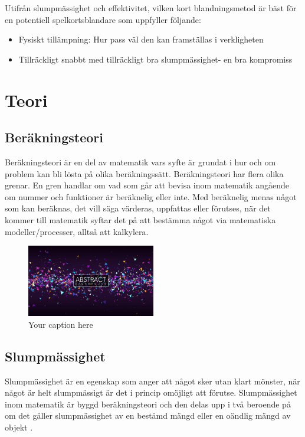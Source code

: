 \documentclass[swedish,a4paper]{article}
\begin{document}
Utifrån slumpmässighet och effektivitet, vilken kort blandningsmetod är bäst för
en potentiell spelkortsblandare som uppfyller följande:
\begin{itemize}
	\item Fysiskt tillämpning: Hur pass väl den kan framställas i verkligheten 
	\item Tillräckligt snabbt med tillräckligt bra slumpmässighet- en bra
		kompromiss
\end{itemize}
\section{Teori}
\subsection{Beräkningsteori}

Beräkningsteori är en del av matematik vars syfte är grundat i hur och om
problem kan bli lösta på olika beräkningssätt. Beräkningsteori har flera olika
grenar. En gren handlar om vad som går att bevisa inom matematik angående om
nummer och funktioner är beräknelig eller inte. Med beräknelig menas något som
kan beräknas, det vill säga värderas, uppfattas eller förutses, när det kommer
till matematik syftar det på att bestämma något via matematiska
modeller/processer, alltså att kalkylera.

\begin{figure}[h]
  \centering
  \includegraphics[width=0.5\textwidth]{images/test.jpg}
  \caption{Your caption here}
  \label{fig: a very cool test image}
\end{figure}

\subsection{Slumpmässighet}

Slumpmässighet är en egenskap som anger att något sker utan klart mönster, när
något är helt slumpmässigt är det i princip omöjligt att förutse. Slumpmässighet
inom matematik är byggd beräknings\-teori och den delas upp i två beroende på om
det gäller slumpmässighet av en bestämd mängd eller en oändlig mängd av objekt
\parencite{Terwijn2016}.
\end{document}
